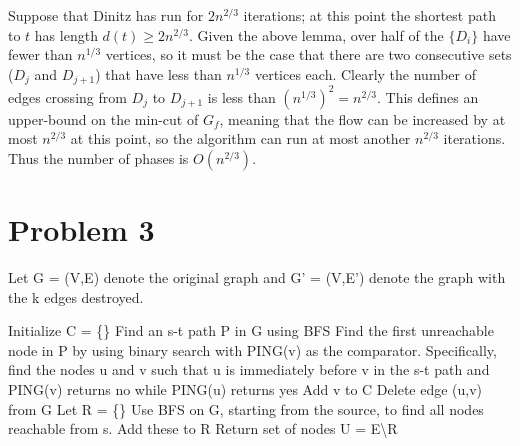 \documentclass{article}
\begin{document}
Suppose that Dinitz has run for $2n^{2/3}$ iterations; at this point the 
shortest path to $t$ has length $d(t)\geq 2n^{2/3}$. 
Given the above lemma, over half of the $\{D_i\}$ have fewer than
$n^{1/3}$ vertices, so it must be the case that there are two consecutive sets
($D_j$ and $D_{j+1}$) that have less than $n^{1/3}$ vertices each.
Clearly the number of edges crossing from $D_j$ to $D_{j+1}$ is less than $(n^{1/3})^2 = n^{2/3}$.
This defines an upper-bound on the min-cut of $G_f$, meaning that the flow
can be increased by at most $n^{2/3}$ at this point, so 
the algorithm can run at most another $n^{2/3}$ iterations. Thus the number
of phases is $O(n^{2/3})$.

\section*{Problem 3}

Let G = (V,E) denote the original graph and G' = (V,E') denote the graph with the k edges destroyed.
\begin{algorithm}[H]
\caption{}
\begin{algorithmic}[1]
\State Initialize C = \{\}
\State Find an s-t path P in G using BFS
\State Find the first unreachable node in P by using binary search with PING(v) as the comparator. Specifically, find the nodes u and v such that u is immediately before v in the s-t path and PING(v) returns no while PING(u) returns yes
\State Add v to C
\State Delete edge (u,v) from G
\EndWhile
\State Let R = \{\}
\State Use BFS on G, starting from the source, to find all nodes reachable from s. Add these to R
\State Return set of nodes U = E\textbackslash R
\end{algorithmic}
\end{algorithm}
\end{document}
